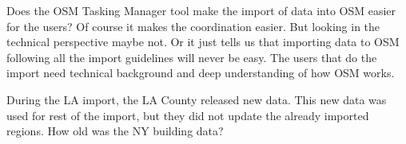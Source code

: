 Does the OSM Tasking Manager tool make the import of data into OSM easier for the users? Of course it makes the coordination easier. But looking in the technical perspective maybe not. Or it just tells us that importing data to OSM following all the import guidelines will never be easy. The users that do the import need technical background and deep understanding of how OSM works. 

During the LA import, the LA County released new data. This new data was used for rest of the import, but they did not update the already imported regions.  %
How old was the NY building data?
